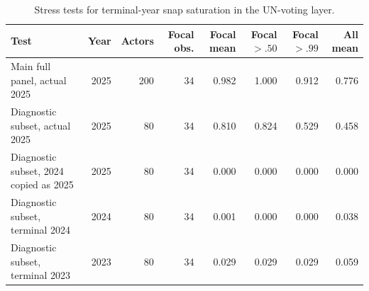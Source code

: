 \begin{table}[!htbp]
\centering
\begingroup
\scriptsize
\caption{Stress tests for terminal-year snap saturation in the UN-voting layer.}
\label{tab:snap-stress-tests}
\begin{tabularx}{\textwidth}{@{}>{\raggedright\arraybackslash}Xrrrrrrr@{}}
\toprule
Test & Year & Actors & Focal obs. & Focal mean & Focal $>.50$ & Focal $>.99$ & All mean \\
\midrule
Main full panel, actual 2025 & 2025 & 200 & 34 & 0.982 & 1.000 & 0.912 & 0.776 \\
Diagnostic subset, actual 2025 & 2025 & 80 & 34 & 0.810 & 0.824 & 0.529 & 0.458 \\
Diagnostic subset, 2024 copied as 2025 & 2025 & 80 & 34 & 0.000 & 0.000 & 0.000 & 0.000 \\
Diagnostic subset, terminal 2024 & 2024 & 80 & 34 & 0.001 & 0.000 & 0.000 & 0.038 \\
Diagnostic subset, terminal 2023 & 2023 & 80 & 34 & 0.029 & 0.029 & 0.029 & 0.059 \\
\bottomrule
\end{tabularx}
\endgroup
\end{table}
